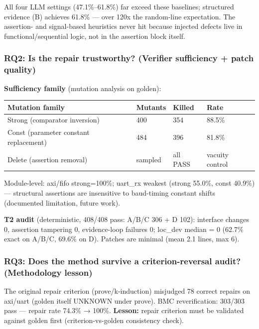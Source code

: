 \documentclass[
  11pt,
]{article}
\newcounter{none} %
\begin{document}
All four LLM settings (47.1\%--61.8\%) far exceed these baselines; structured evidence (B) achieves 61.8\% --- over 120x the random-line expectation. The assertion- and signal-based heuristics never hit because injected defects live in functional/sequential logic, not in the assertion block itself.

\subsubsection{RQ2: Is the repair trustworthy? (Verifier sufficiency + patch quality)}\label{rq2-is-the-repair-trustworthy-verifier-sufficiency-patch-quality}

\textbf{Sufficiency family} (mutation analysis on golden):

{\def\LTcaptype{none} %
\begin{longtable}[]{@{}llll@{}}
\toprule\noalign{}
Mutation family & Mutants & Killed & Rate \\
\midrule\noalign{}
\endhead
\bottomrule\noalign{}
\endlastfoot
Strong (comparator inversion) & 400 & 354 & 88.5\% \\
Const (parameter constant replacement) & 484 & 396 & 81.8\% \\
Delete (assertion removal) & sampled & all PASS & vacuity control \\
\end{longtable}
}

Module-level: axi/fifo strong=100\%; uart\_rx weakest (strong 55.0\%, const 40.9\%) --- structural assertions are insensitive to baud-timing constant shifts (documented limitation, future work).

\textbf{T2 audit} (deterministic, 408/408 pass: A/B/C 306 + D 102): interface changes 0, assertion tampering 0, evidence-loop failures 0; loc\_dev median = 0 (62.7\% exact on A/B/C, 69.6\% on D). Patches are minimal (mean 2.1 lines, max 6).

\subsubsection{RQ3: Does the method survive a criterion-reversal audit? (Methodology lesson)}\label{rq3-does-the-method-survive-a-criterion-reversal-audit-methodology-lesson}

The original repair criterion (prove/k-induction) misjudged 78 correct repairs on axi/uart (golden itself UNKNOWN under prove). BMC reverification: 303/303 pass --- repair rate 74.3\% → 100\%. \textbf{Lesson:} repair criterion must be validated against golden first (criterion-vs-golden consistency check).
\end{document}
